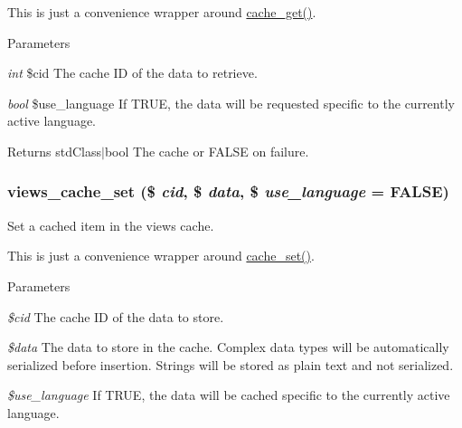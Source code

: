 This is just a convenience wrapper around \hyperlink{includes_2cache_8inc_a9d873815c28909b61c3a6188b383f8a3}{cache\_\-get()}.


\begin{DoxyParams}{Parameters}
\item[{\em int}]\$cid The cache ID of the data to retrieve. \item[{\em bool}]\$use\_\-language If TRUE, the data will be requested specific to the currently active language.\end{DoxyParams}
\begin{DoxyReturn}{Returns}
stdClass$|$bool The cache or FALSE on failure. 
\end{DoxyReturn}
\hypertarget{profiles_2dosomething_2modules_2contrib_2views_2includes_2cache_8inc_a40508277eb295523eb45a067c8a84324}{
\subsubsection[{views\_\-cache\_\-set}]{\setlength{\rightskip}{0pt plus 5cm}views\_\-cache\_\-set (\$ {\em cid}, \/  \$ {\em data}, \/  \$ {\em use\_\-language} = {\ttfamily FALSE})}}
\label{profiles_2dosomething_2modules_2contrib_2views_2includes_2cache_8inc_a40508277eb295523eb45a067c8a84324}
Set a cached item in the views cache.

This is just a convenience wrapper around \hyperlink{includes_2cache_8inc_a48081f36334909f561ef4f538fa640d2}{cache\_\-set()}.


\begin{DoxyParams}{Parameters}
\item[{\em \$cid}]The cache ID of the data to store. \item[{\em \$data}]The data to store in the cache. Complex data types will be automatically serialized before insertion. Strings will be stored as plain text and not serialized. \item[{\em \$use\_\-language}]If TRUE, the data will be cached specific to the currently active language. \end{DoxyParams}

